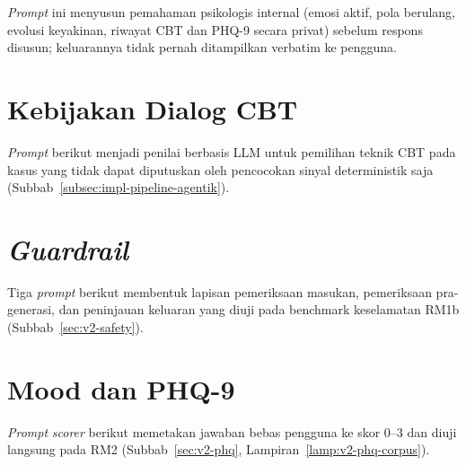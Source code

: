 \textit{Prompt} ini menyusun pemahaman psikologis internal (emosi aktif, pola berulang, evolusi keyakinan, riwayat CBT dan PHQ-9 secara privat) sebelum respons disusun; keluarannya tidak pernah ditampilkan verbatim ke pengguna.


\section{Kebijakan Dialog CBT}
\label{lamp:prompt-cbt-router}

\textit{Prompt} berikut menjadi penilai berbasis LLM untuk pemilihan teknik CBT pada kasus yang tidak dapat diputuskan oleh pencocokan sinyal deterministik saja (Subbab~\ref{subsec:impl-pipeline-agentik}).


\section{\textit{Guardrail}}
\label{lamp:prompt-guardrail}

Tiga \textit{prompt} berikut membentuk lapisan pemeriksaan masukan, pemeriksaan pra-generasi, dan peninjauan keluaran yang diuji pada benchmark keselamatan RM1b (Subbab~\ref{sec:v2-safety}).




\section{Mood dan PHQ-9}
\label{lamp:prompt-phq9}

\textit{Prompt} \textit{scorer} berikut memetakan jawaban bebas pengguna ke skor 0--3 dan diuji langsung pada RM2 (Subbab~\ref{sec:v2-phq}, Lampiran~\ref{lamp:v2-phq-corpus}).


